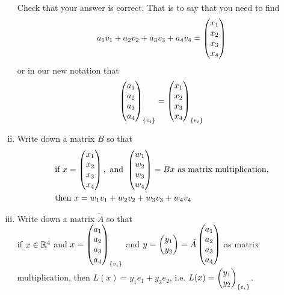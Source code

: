 \begin{question}
\begin{enumerate}[(i)]
\[\begin{aligned}
            \end{aligned}
        \]
        Check that your answer is correct. That is to say that you need to find 
        \[
            \begin{aligned}
                a_1v_1+a_2v_2+a_3v_3+a_4v_4=\begin{pmatrix} x_1\\ x_2\\x_3 \\ x_4\end{pmatrix}
            \end{aligned}
        \]
        or in our new notation that 
        \[
            \begin{aligned}
                \begin{pmatrix} a_1\\ a_2\\a_3 \\ a_4\end{pmatrix}_{\{v_i\}}=\begin{pmatrix} x_1\\ x_2\\x_3 \\ x_4\end{pmatrix}_{\{e_i\}}
            \end{aligned}
        \]
        \item Write down a matrix $B$ so that 
        \[
            \begin{aligned}
                &\text{if } x=\begin{pmatrix} x_1\\ x_2\\x_3 \\ x_4\end{pmatrix},\text{ and } \begin{pmatrix} w_1\\ w_2\\w_3 \\ w_4\end{pmatrix}=Bx\text{ as matrix multiplication,}\\
                &\text{then } x=w_1v_1+w_2v_2+w_3v_3+w_4v_4
            \end{aligned}
        \]
        \item Write down a matrix $\tilde{A}$ so that\\
        if $x\in\mathbb R^4$ and $x=\begin{pmatrix} a_1\\ a_2\\a_3 \\ a_4\end{pmatrix}_{\{v_i\}}$ and $y=\begin{pmatrix} y_1\\ y_2\end{pmatrix}=\tilde{A}\begin{pmatrix} a_1\\ a_2\\a_3 \\ a_4\end{pmatrix}$ as matrix multiplication, then $L(x)=y_1e_1+y_2e_2$, i.e. $L(x)=\begin{pmatrix} y_1\\ y_2\end{pmatrix}_{\{e_i\}}$.
    \end{enumerate}
\end{question}

